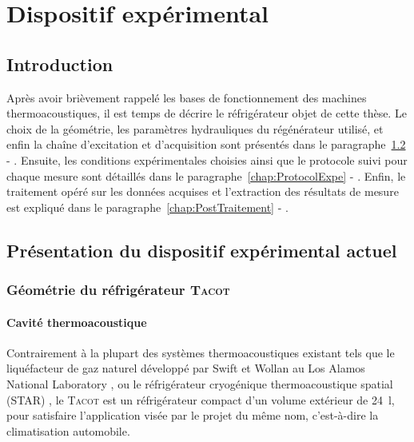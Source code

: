 \chapter{Dispositif expérimental}\label{chap:DispositifExpe}
\mylocaltoc
\newpage

\section{Introduction}\label{chap:IntroProtocExp}
Après avoir brièvement rappelé les bases de fonctionnement des machines thermoacoustiques, il est temps de décrire le réfrigérateur objet de cette thèse. Le choix de la géométrie, les paramètres hydrauliques du régénérateur utilisé, et enfin la chaîne d'excitation et d'acquisition sont présentés dans le paragraphe~\ref{chap:PresentationTacot} - . Ensuite, les conditions expérimentales choisies ainsi que le protocole suivi pour chaque mesure sont détaillés dans le paragraphe~\ref{chap:ProtocolExpe} - . Enfin, le traitement opéré sur les données acquises et l'extraction des résultats de mesure est expliqué dans le paragraphe~\ref{chap:PostTraitement} - .


\section{Présentation du dispositif expérimental actuel}\label{chap:PresentationTacot}



\subsection{Géométrie du réfrigérateur \textsc{Tacot}}
\subsubsection{Cavité thermoacoustique}
Contrairement à la plupart des systèmes thermoacoustiques existant tels que le liquéfacteur de gaz naturel développé par Swift et Wollan au Los Alamos National Laboratory \cite{swift_thermoacoustics_2002, wollan_development_2002}, ou le réfrigérateur cryogénique thermoacoustique spatial (STAR) \cite{adeff_measurement_1991, garrett_thermoacoustic_1993}, le \textsc{Tacot} est un réfrigérateur compact d'un volume extérieur de \qty{24}{\litre}, pour satisfaire l'application visée par le projet du même nom, c'est-à-dire la climatisation automobile. 

